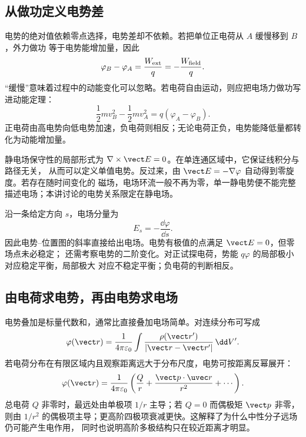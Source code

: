 \subsection*{从做功定义电势差}

电势的绝对值依赖零点选择，电势差却不依赖。若把单位正电荷从 $A$ 缓慢移到 $B$，外力做功
等于电势能增加量，因此
\begin{equation}
 \varphi_B-\varphi_A=\frac{W_{\rm ext}}q=-\frac{W_{\rm field}}q.
\end{equation}
“缓慢”意味着过程中的动能变化可以忽略。若电荷自由运动，则应把电场力做功写进动能定理：
\begin{equation}
 \frac12mv_B^2-\frac12mv_A^2=q(\varphi_A-\varphi_B).
\end{equation}
正电荷由高电势向低电势加速，负电荷则相反；无论电荷正负，电势能降低量都转化为动能增加量。

静电场保守性的局部形式为 $\nabla\times\vect E=0$。在单连通区域中，它保证线积分与路径无关，
从而可以定义单值电势。反过来，由 $\vect E=-\nabla\varphi$ 自动得到零旋度。若存在随时间变化的
磁场，电场环流一般不再为零，单一静电势便不能完整描述电场；本讲讨论的电势关系限定在静电场。

沿一条给定方向 $s$，电场分量为
\begin{equation}
 E_s=-\frac{\dd\varphi}{\dd s}.
\end{equation}
因此电势--位置图的斜率直接给出电场。电势有极值的点满足 $\vect E=0$，但零场点未必稳定；
还需考察电势的二阶变化。对正试探电荷，势能 $q\varphi$ 的局部极小对应稳定平衡，局部极大
对应不稳定平衡；负电荷的判断相反。

\subsection*{由电荷求电势，再由电势求电场}

电势叠加是标量代数和，通常比直接叠加电场简单。对连续分布可写成
\begin{equation}
 \varphi(\vect r)=\frac1{4\pi\varepsilon_0}
 \int\frac{\rho(\vect r')}{|\vect r-\vect r'|}\,\dd V'.
\end{equation}
若电荷分布在有限区域内且观察距离远大于分布尺度，电势可按距离反幂展开：
\begin{equation}
 \varphi(\vect r)=\frac1{4\pi\varepsilon_0}
 \left(\frac Qr+\frac{\vect p\cdot\uvec r}{r^2}+\cdots\right).
\end{equation}
总电荷 $Q$ 非零时，最远处由单极项 $1/r$ 主导；若 $Q=0$ 而偶极矩 $\vect p$ 非零，则由
$1/r^2$ 的偶极项主导；更高阶四极项衰减更快。这解释了为什么中性分子远场仍可能产生电作用，
同时也说明高阶多极结构只在较近距离才明显。


